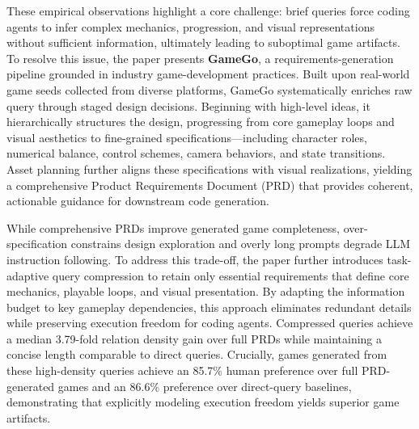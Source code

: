 \documentclass{article}
\begin{document}
These empirical observations highlight a core challenge: brief queries force coding agents to infer complex mechanics, progression, and visual representations without sufficient information, ultimately leading to suboptimal game artifacts. To resolve this issue, the paper presents \textbf{GameGo}, a requirements-generation pipeline grounded in industry game-development practices. Built upon real-world game seeds collected from diverse platforms, GameGo systematically enriches raw query through staged design decisions. Beginning with high-level ideas, it hierarchically structures the design, progressing from core gameplay loops and visual aesthetics to fine-grained specifications—including character roles, numerical balance, control schemes, camera behaviors, and state transitions. Asset planning further aligns these specifications with visual realizations, yielding a comprehensive Product Requirements Document (PRD) that provides coherent, actionable guidance for downstream code generation.


While comprehensive PRDs improve generated game completeness, over-specification constrains design exploration and overly long prompts degrade LLM instruction following. To address this trade-off, the paper further introduces task-adaptive query compression to retain only essential requirements that define core mechanics, playable loops, and visual presentation. By adapting the information budget to key gameplay dependencies, this approach eliminates redundant details while preserving execution freedom for coding agents. Compressed queries achieve a median 3.79-fold relation density gain over full PRDs while maintaining a concise length comparable to direct queries. Crucially, games generated from these high-density queries achieve an 85.7\% human preference over full PRD-generated games and an 86.6\% preference over direct-query baselines, demonstrating that explicitly modeling execution freedom yields superior game artifacts.
\end{document}
